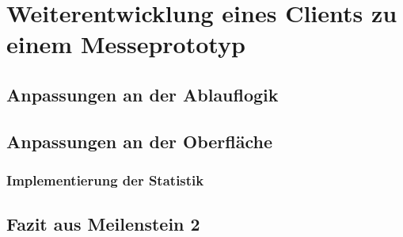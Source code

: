 \chapter{Weiterentwicklung eines Clients zu einem Messeprototyp}
\label{cha:weiterentwicklung-messeprototyp}

\section{Anpassungen an der Ablauflogik}
\label{sec:anpassungen-ablauflogik}

\section{Anpassungen an der Oberfläche}
\label{sec:anpassungen-oberflaeche}

\subsection{Implementierung der Statistik}
\label{ssec:implementierung-statistik}

\section{Fazit aus Meilenstein 2}
\label{sec:fazit-meilenstein-2}
